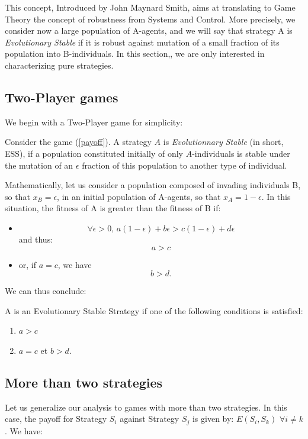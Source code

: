 This concept, Introduced by John Maynard Smith, aims at translating to Game Theory the concept of robustness from Systems and Control.  More precisely, we consider now a large population of A-agents, and we will say that strategy A is \emph{Evolutionary Stable} if it is robust against mutation of a small fraction of its population into B-individuals. 
In this section,, we are only interested in characterizing pure strategies.
\subsection{Two-Player games}

We begin with a Two-Player game for simplicity:
\begin{definition}
Consider the game (\ref{payoff}).  A strategy $A$ is \emph{Evolutionnary Stable} (in short, ESS), if a population constituted initially of only $A$-individuals is stable under the mutation of an $\epsilon$ fraction of this population to another type of individual.
\end{definition}
Mathematically, let us consider a population composed of invading individuals B, so that   $x_B=\epsilon$, in an initial population of A-agents, so that $x_A=1 - \epsilon$. In this situation, the fitness of A is greater than the fitness of B if:
\begin{itemize}
\item \begin{equation}
\forall \epsilon>0, \, a(1-\epsilon) + b \epsilon > c(1-\epsilon)+d\epsilon \label{inegalite}
\end{equation}
and thus:
\begin{equation}
a > c
\end{equation}
\item or, if
$a=c$, we have
\begin{equation}
b>d.
\end{equation}
\end{itemize}
We can thus conclude:

\begin{proposition} A is an Evolutionary Stable Strategy if one of the following conditions is satisfied:
\begin{enumerate}
\item $a>c$ 
\item $a=c$ et $b>d.$
\end{enumerate}
\end{proposition}
\subsection{More than two strategies}
Let us generalize our analysis to games with more than two strategies.  In this case, the payoff for Strategy $S_i$ against Strategy $S_j$ is given by: $E(S_i,S_k)$ $\forall i \neq k$. We have:

